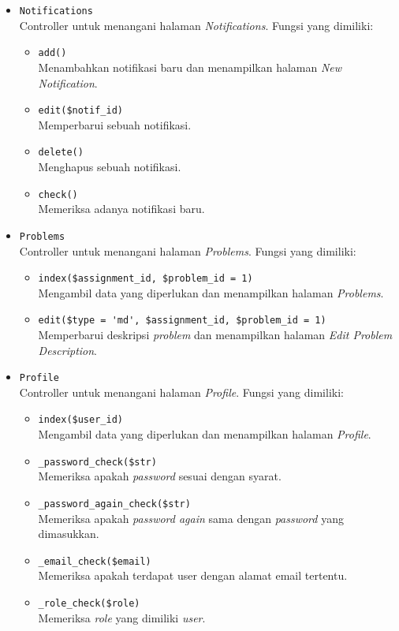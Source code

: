 \begin{itemize}
	\item \verb|Notifications| \\ Controller untuk menangani halaman \textit{Notifications}. Fungsi yang dimiliki:
	\begin{itemize}
		\item \verb|add()| \\ Menambahkan notifikasi baru dan menampilkan halaman \textit{New Notification}.
		\item \verb|edit($notif_id)| \\ Memperbarui sebuah notifikasi.
		\item \verb|delete()| \\ Menghapus sebuah notifikasi.
		\item \verb|check()| \\ Memeriksa adanya notifikasi baru.
	\end{itemize}
	
	\item \verb|Problems| \\ Controller untuk menangani halaman \textit{Problems}. Fungsi yang dimiliki:
	\begin{itemize}
		\item \verb|index($assignment_id, $problem_id = 1)| \\ Mengambil data yang diperlukan dan menampilkan halaman \textit{Problems}.
		\item \verb|edit($type = 'md', $assignment_id, $problem_id = 1)| \\ Memperbarui deskripsi \textit{problem} dan menampilkan halaman \textit{Edit Problem Description}.
	\end{itemize}
	
	\item \verb|Profile| \\ Controller untuk menangani halaman \textit{Profile}. Fungsi yang dimiliki:
	\begin{itemize}
		\item \verb|index($user_id)| \\ Mengambil data yang diperlukan dan menampilkan halaman \textit{Profile}.
		\item \verb|_password_check($str)| \\ Memeriksa apakah \textit{password} sesuai dengan syarat.
		\item \verb|_password_again_check($str)| \\ Memeriksa apakah \textit{password again} sama dengan \textit{password} yang dimasukkan.
		\item \verb|_email_check($email)| \\ Memeriksa apakah terdapat user dengan alamat email tertentu.
		\item \verb|_role_check($role)| \\ Memeriksa \textit{role} yang dimiliki \textit{user}.
	\end{itemize}
	

\end{itemize}
